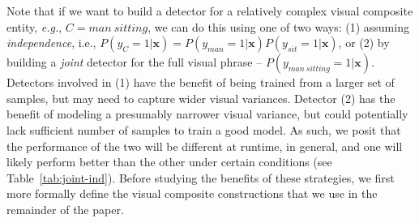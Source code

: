 \documentclass[runningheads]{llncs}
\makeatletter
\newcommand{\Guy} [1]{{\color{RoyalBlue}{#1}}}
\newcommand*{\eg}{{\em e.g.}\@\xspace}
\makeatother
\begin{document}
Note that if we want to build a detector for a relatively complex visual composite entity, \eg, $C = man~sitting$, we can do this using one of two ways: (1) assuming {\em independence}, i.e., 
$P(y_{C} = 1 | \mathbf{x} ) = P(y_{man} = 1 | \mathbf{x}) P(y_{sit} = 1 | \mathbf{x})$, or (2) by building a {\em joint} detector for the full visual phrase -- $P(y_{man~sitting} = 1 | \mathbf{x} )$. Detectors involved in (1) have the benefit of being trained from a larger set of samples, but may need to capture wider visual variances. Detector (2) has the benefit of modeling a presumably narrower visual variance, but could potentially lack sufficient number of samples to train a good model. As such, we posit that the performance of the two will be different at runtime, in general, and one will likely perform better than the other under certain conditions (see Table~\ref{tab:joint-ind}). Before studying the benefits of these strategies, we first more formally define the visual composite constructions that we use in the remainder of the paper. 




\end{document}
